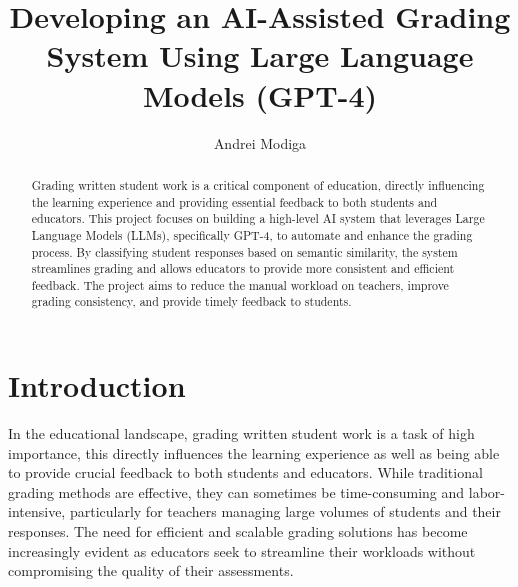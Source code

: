 \documentclass[ms,twoside,print]{nuthesis}
\begin{document}
\frontmatter

\title{Developing an AI-Assisted Grading System Using Large Language Models (GPT-4)}
\author{Andrei Modiga}



\maketitle

\begin{abstract}
    Grading written student work is a critical component of education, directly influencing the learning experience and providing essential feedback to both students and educators. This project focuses on building a high-level AI system that leverages Large Language Models (LLMs), specifically GPT-4, to automate and enhance the grading process. By classifying student responses based on semantic similarity, the system streamlines grading and allows educators to provide more consistent and efficient feedback. The project aims to reduce the manual workload on teachers, improve grading consistency, and provide timely feedback to students.
\end{abstract}

\setcounter{tocdepth}{2} %
\tableofcontents
\listoffigures
\listoftables

\mainmatter

\chapter{Introduction}
In the educational landscape, grading written student work is a task of high importance, this directly influences the learning experience as well as being able to provide crucial feedback to both students and educators. While traditional grading methods are effective, they can sometimes be time-consuming and labor-intensive, particularly for teachers managing large volumes of students and their responses. The need for efficient and scalable grading solutions has become increasingly evident as educators seek to streamline their workloads without compromising the quality of their assessments.
\end{document}
